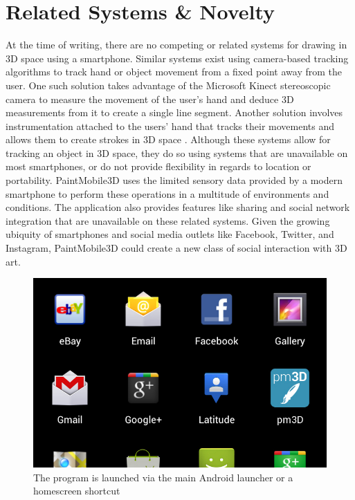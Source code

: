 \documentclass{chi-ext}
\begin{document}
\section{Related Systems \& Novelty}

At the time of writing, there are no competing or related systems for drawing
in 3D space using a smartphone. Similar systems exist using camera-based
tracking algorithms to track hand or object movement from a fixed point away
from the user. One such solution takes advantage of the Microsoft Kinect
stereoscopic camera to measure the movement of the user’s hand and deduce 3D
measurements from it to create a single line segment. Another solution
involves instrumentation attached to the users' hand that tracks their
movements and allows them to create strokes in 3D space
\cite{schkolne2002drawing}. Although these systems allow for tracking an
object in 3D space, they do so using systems that are unavailable on most
smartphones, or do not provide flexibility in regards to location or
portability. PaintMobile3D uses the limited sensory data provided by a modern
smartphone to perform these operations in a multitude of environments and
conditions. The application also provides features like sharing and social
network integration that are unavailable on these related systems. Given the
growing ubiquity of smartphones and social media outlets like Facebook,
Twitter, and Instagram, PaintMobile3D could create a new class of social
interaction with 3D art.

\begin{figure}
\parbox{\columnwidth}{
  \centering
  \includegraphics[width=\columnwidth]{icon.jpg}
  \caption{The program is launched via the main Android launcher or a homescreen shortcut}
  \label{fig:icon}
}
\end{figure}
\end{document}
